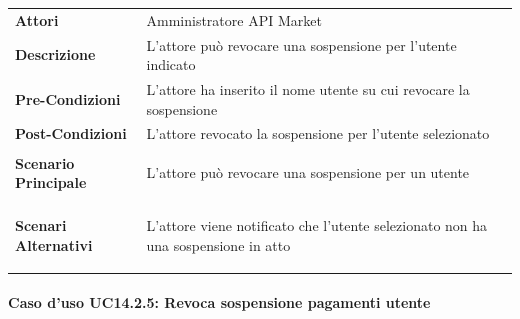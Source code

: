 \begin{minipage}{\linewidth}
	\begin{tabular}{ l | p{11cm}}
		\hline
		\rowcolor{Gray}
		\multicolumn{2}{c}{UC14.2.4 - Revoca sospensione utente} \\
		\hline
		\textbf{Attori} & Amministratore API Market \\
		\textbf{Descrizione} & L'attore può revocare una sospensione per l'utente indicato \\
		\textbf{Pre-Condizioni} & L'attore ha inserito il nome utente su cui revocare la sospensione\\
		\textbf{Post-Condizioni} & L'attore revocato la sospensione per l'utente selezionato \\
		\textbf{Scenario Principale} & 
		\begin{enumerate*}[label=(\arabic*.),itemjoin={\newline}]
			\item L'attore può revocare una sospensione per un utente
		\end{enumerate*}\\
		\textbf{Scenari Alternativi} & 
		\begin{enumerate*}[label=(\arabic*.),itemjoin={\newline}]
			\item L'attore viene notificato che l'utente selezionato non ha una sospensione in atto
		\end{enumerate*}\\
	\end{tabular}
\end{minipage}

\paragraph{Caso d'uso UC14.2.5: Revoca sospensione pagamenti utente}
\label{UC14_2_5}

